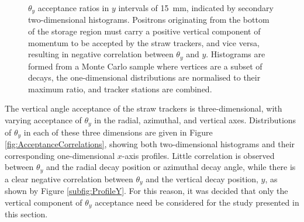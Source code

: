 \begin{figure}[t!]
\hfill
{}
\caption{$\theta_{y}$ acceptance ratios in $y$ intervals of \SI{15}{\milli\metre}, indicated by secondary two-dimensional histograms. Positrons originating from the bottom of the storage region must carry a positive vertical component of momentum to be accepted by the straw trackers, and vice versa, resulting in negative correlation between $\theta_{y}$ and $y$. Histograms are formed from a Monte Carlo sample where vertices are a subset of decays, the one-dimensional distributions are normalised to their maximum ratio, and tracker stations are combined.} 
\label{fig:1DAcceptanceRatios}
\end{figure} 

The vertical angle acceptance of the straw trackers is three-dimensional, with varying acceptance of $\theta_{y}$ in the radial, azimuthal, and vertical axes. Distributions of $\theta_{y}$ in each of these three dimensions are given in Figure \ref{fig:AcceptanceCorrelations}, showing both two-dimensional histograms and their corresponding one-dimensional $x$-axis profiles. Little correlation is observed between $\theta_{y}$ and the radial decay position or azimuthal decay angle, while there is a clear negative correlation between $\theta_{y}$ and the vertical decay position, $y$, as shown by Figure \ref{subfig:ProfileY}. For this reason, it was decided that only the vertical component of $\theta_{y}$ acceptance need be considered for the study presented in this section.

